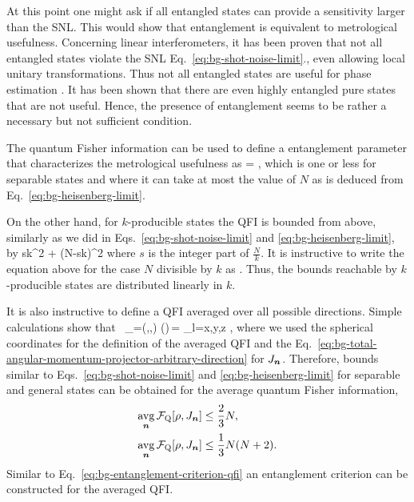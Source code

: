 At this point one might ask if all entangled states can provide a sensitivity larger than the SNL.
This would show that entanglement is equivalent to metrological usefulness.
Concerning linear interferometers, it has been proven that not all entangled states violate the SNL Eq.~\eqref{eq:bg-shot-noise-limit}., even allowing local unitary transformations.
Thus not all entangled states are useful for phase estimation \citep{Hyllus2010}.
It has been shown that there are even highly entangled pure states that are not useful.
Hence, the presence of entanglement seems to be rather a necessary but not sufficient condition.

The quantum Fisher information can be used to define a entanglement parameter that characterizes the metrological usefulness as
\be
  \label{eq:bg-entanglement-criterion-qfi}
  \chi = ,
\ee
which is one or less for separable states and where it can take at most the value of $N$ as is deduced from Eq.~\eqref{eq:bg-heisenberg-limit}.

On the other hand, for $k$-producible states the QFI is bounded from above, similarly as we did in Eqs.~\eqref{eq:bg-shot-noise-limit} and \eqref{eq:bg-heisenberg-limit}, by \citep{Hyllus2012, Toth2012}
\be
  \leq sk^2 + (N-sk)^2
\ee
where $s$ is the integer part of $\frac{N}{k}$.
It is instructive to write the equation above for the case $N$ divisible by $k$ as
\be
  .
\ee
Thus, the bounds reachable by $k$-producible states are distributed linearly in $k$.

It is also instructive to define a QFI averaged over all possible directions.
Simple calculations show that
\be
  \label{eq:bg-average-qfi}
  \, \equiv  \int_{=(\coss{\varphi}\sins{\vartheta},\sins{\varphi}\sins{\vartheta},\coss{\vartheta})} \sin(\vartheta)\,\varphi{}\vartheta = \sum_{l=x,y,z} ,
\ee
where we used the spherical coordinates for the definition of the averaged QFI and the Eq.~\eqref{eq:bg-total-angular-momentum-projector-arbitrary-direction} for $J_{\boldsymbol{n}}$.
Therefore, bounds similar to Eqs.~\eqref{eq:bg-shot-noise-limit} and \eqref{eq:bg-heisenberg-limit} for separable and general states can be obtained for the average quantum Fisher information,
\begin{align}
  \underset{\boldsymbol{n}}{\text{avg}}\,\mathcal{F}_{\textnormal{Q}}[{\textstyle \rho, J_{\boldsymbol{n}}}] &\leq \frac{2}{3}N, \\
  \underset{\boldsymbol{n}}{\text{avg}}\,\mathcal{F}_{\textnormal{Q}}[{\textstyle \rho, J_{\boldsymbol{n}}}] &\leq \frac{1}{3}N(N+2).
\end{align}
Similar to Eq.~\eqref{eq:bg-entanglement-criterion-qfi} an entanglement criterion can be constructed for the averaged QFI.

